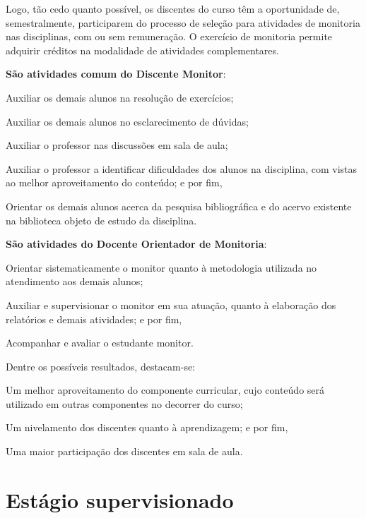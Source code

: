 \documentclass[
	12pt,				%
	openright,			%
	twoside,			%
	a4paper,			%
	chapter=TITLE,		%
	english,			%
	french,				%
	spanish,			%
	brazil,				%
	]{abntex2}
\begin{document}
Logo, tão cedo quanto possível,  os discentes do curso têm a oportunidade de, semestralmente, participarem do processo de seleção para atividades de monitoria nas disciplinas, com ou sem remuneração. O exercício de monitoria permite adquirir créditos na modalidade de atividades complementares.


\textbf{São atividades comum do Discente Monitor}:
\begin{alineas}
\item Auxiliar os demais alunos na resolução de exercícios;
\item Auxiliar os demais alunos no esclarecimento de dúvidas;
\item Auxiliar o professor nas discussões em sala de aula;
\item Auxiliar o professor a identificar dificuldades dos alunos na disciplina, com vistas ao melhor aproveitamento do conteúdo; e por fim,
\item Orientar os demais alunos acerca da pesquisa bibliográfica e do acervo existente na biblioteca objeto de estudo da disciplina.

\end{alineas}


\textbf{São atividades do Docente Orientador de Monitoria}:
\begin{alineas}
\item Orientar sistematicamente o monitor quanto à metodologia utilizada no atendimento aos demais alunos;
\item Auxiliar e supervisionar o monitor em sua atuação, quanto à elaboração dos relatórios e demais atividades; e por fim,
\item Acompanhar e avaliar o estudante monitor.
\end{alineas}

Dentre os possíveis resultados, destacam-se: 
\begin{alineas}
\item Um melhor aproveitamento do componente curricular, cujo conteúdo será utilizado em outras componentes no decorrer do curso;
\item Um nivelamento dos discentes quanto à aprendizagem; e por fim,
\item Uma maior participação dos discentes em sala de aula.
\end{alineas}



\chapter{Estágio supervisionado}
\end{document}
